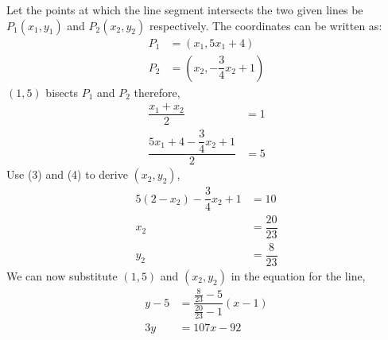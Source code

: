 \begin{solution}[\fullpage]
  Let the points at which the line segment intersects the two given lines
  be $P_1(x_1, y_1)$ and $P_2(x_2, y_2)$ respectively. The coordinates can be
  written as:
  \begin{align}
    P_1 &= (x_1, 5x_1+4) \\
    P_2 &= (x_2, -\dfrac{3}{4}x_2+1)    
  \end{align}
  $(1,5)$ bisects $P_1$ and $P_2$ therefore,
  \begin{align}
    \dfrac{x_1+x_2}{2}                     &= 1 \\
    \dfrac{5x_1+4-\dfrac{3}{4}x_2+1}{2}    &= 5  
  \end{align}
  Use (3) and (4) to derive $(x_2, y_2)$,
  \begin{align}
    5(2-x_2)-\dfrac{3}{4}x_2+1 &= 10 \nonumber \\
                           x_2 &= \dfrac{20}{23} \nonumber \\
                           y_2 &= \dfrac{8}{23} \nonumber
  \end{align}
  We can now substitute $(1,5)$ and $(x_2, y_2)$ in the equation for 
  the line, 
  \begin{align}
    y-5 &= \dfrac{\frac{8}{23}-5}{\frac{20}{23}-1}(x-1) \nonumber \\
    3y  &= 107x - 92									\nonumber    
  \end{align}
\end{solution}
